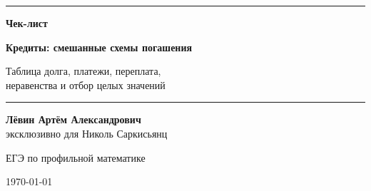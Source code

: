 \documentclass[a4paper,12pt]{article}
\begin{document}

\begin{titlepage}
\thispagestyle{empty}

\centering

\vspace*{3.2cm}

{\color{darkaccent}\rule{0.72\linewidth}{1.1pt}}

\vspace{1.2cm}

{\fontsize{27}{32}\selectfont\bfseries
Чек-лист\par}

\vspace{0.55cm}

{\fontsize{20}{25}\selectfont\bfseries
Кредиты: смешанные схемы погашения\par}

\vspace{0.35cm}

{\large
Таблица долга, платежи, переплата,\\
неравенства и отбор целых значений\par}

\vspace{1.2cm}

{\color{accent}\rule{0.42\linewidth}{0.8pt}}

\vspace{2.2cm}

{\large
\textbf{Лёвин Артём Александрович}\\[0.35em]
эксклюзивно для Николь Саркисьянц
\par}

\vspace{0.8cm}

{\normalsize
ЕГЭ по профильной математике
\par}

\vfill

{\large \today}

\vspace{1.6cm}


\vspace{0.7cm}

\end{titlepage}
\end{document}
